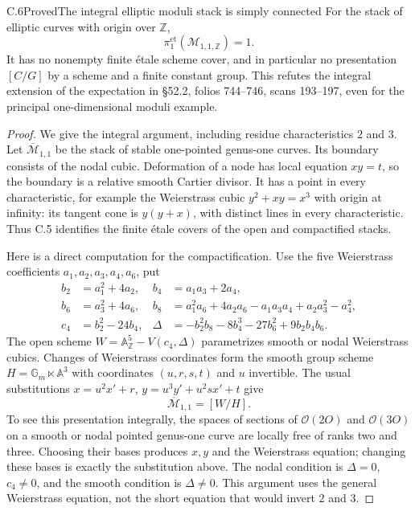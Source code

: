 \begin{statement}{C.6}{Proved}{The integral elliptic moduli stack is simply connected}
For the stack of elliptic curves with origin over $\mathbb Z$,
\[
 \pi_1^{\mathrm{et}}(\mathcal M_{1,1,\mathbb Z})=1.
\]
It has no nonempty finite \'etale scheme cover, and in particular
no presentation $[C/G]$ by a scheme and a finite constant group.
This refutes the integral extension of the expectation in
\S52.2, folios 744--746, scans 193--197, even for the principal
one-dimensional moduli example.
\end{statement}
\begin{proof}
We give the integral argument, including residue characteristics
$2$ and $3$. Let $\overline{\mathcal M}_{1,1}$ be the stack of
stable one-pointed genus-one curves. Its boundary consists of
the nodal cubic. Deformation of a node has local equation
$xy=t$, so the boundary is a relative smooth Cartier divisor.
It has a point in every characteristic, for example the
Weierstrass cubic $y^2+xy=x^3$ with origin at infinity:
its tangent cone is $y(y+x)$, with distinct lines in every
characteristic. Thus C.5 identifies the finite \'etale covers
of the open and compactified stacks.

Here is a direct computation for the compactification. Use the
five Weierstrass coefficients $a_1,a_2,a_3,a_4,a_6$, put
\[
\begin{aligned}
b_2&=a_1^2+4a_2,& b_4&=a_1a_3+2a_4,\\
b_6&=a_3^2+4a_6,&
b_8&=a_1^2a_6+4a_2a_6-a_1a_3a_4+a_2a_3^2-a_4^2,\\
c_4&=b_2^2-24b_4,&
\Delta&=-b_2^2b_8-8b_4^3-27b_6^2+9b_2b_4b_6.
\end{aligned}
\]
The open scheme
$W=\mathbb A^5_{\mathbb Z}-V(c_4,\Delta)$ parametrizes
smooth or nodal Weierstrass cubics. Changes of Weierstrass
coordinates form the smooth group scheme
$H=\mathbb G_m\ltimes\mathbb A^3$ with coordinates
$(u,r,s,t)$ and $u$ invertible. The usual substitutions
$x=u^2x'+r$, $y=u^3y'+u^2sx'+t$ give
\[
 \overline{\mathcal M}_{1,1}=[W/H].
\]
To see this presentation integrally, the spaces of sections of
$\mathcal O(2O)$ and $\mathcal O(3O)$ on a smooth or nodal
pointed genus-one curve are locally free of ranks two and
three. Choosing their bases produces $x,y$ and the Weierstrass
equation; changing these bases is exactly the substitution
above. The nodal condition is $\Delta=0$, $c_4\ne0$,
and the smooth condition is $\Delta\ne0$. This argument uses
the general Weierstrass equation, not the short equation
that would invert $2$ and $3$.


\end{proof}
